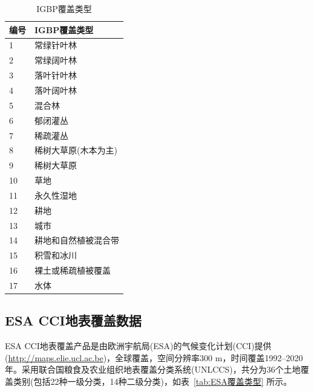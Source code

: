 \begin{table}[htbp]
  \centering
  \caption{IGBP覆盖类型}
  \label{tab:IGBP覆盖类型}
  \begin{tabular}{@{}ll@{}}
    \toprule
    编号 & IGBP覆盖类型         \\ \midrule
    1    & 常绿针叶林           \\
    2    & 常绿阔叶林           \\
    3    & 落叶针叶林           \\
    4    & 落叶阔叶林           \\
    5    & 混合林               \\
    6    & 郁闭灌丛             \\
    7    & 稀疏灌丛             \\
    8    & 稀树大草原(木本为主) \\
    9    & 稀树大草原           \\
    10   & 草地                 \\
    11   & 永久性湿地           \\
    12   & 耕地                 \\
    13   & 城市                 \\
    14   & 耕地和自然植被混合带 \\
    15   & 积雪和冰川           \\
    16   & 裸土或稀疏植被覆盖   \\
    17   & 水体                 \\ \bottomrule
  \end{tabular}
\end{table}

\subsection{ESA CCI地表覆盖数据}\label{ESA地表覆盖数据}
ESA CCI地表覆盖产品是由欧洲宇航局(ESA)的气候变化计划(CCI)提供(\url{http://maps.elie.ucl.ac.be})，全球覆盖，空间分辨率300 m，时间覆盖1992--2020年。采用联合国粮食及农业组织地表覆盖分类系统(UNLCCS)，共分为36个土地覆盖类别(包括22种一级分类，14种二级分类)，如表~\ref{tab:ESA覆盖类型} 所示。

